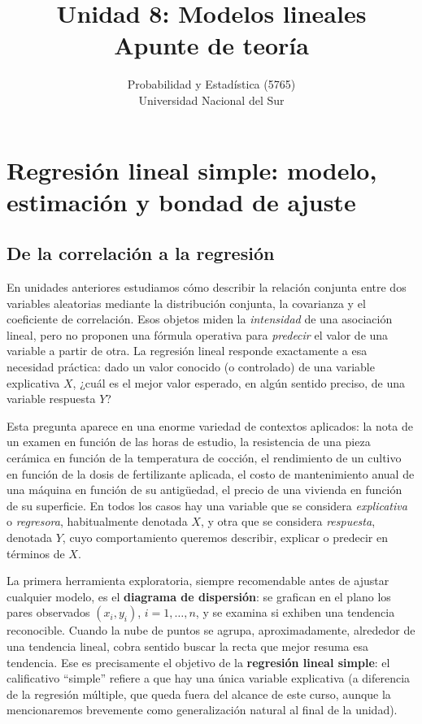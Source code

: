 \documentclass[11pt,a4paper]{article}
\title{Unidad 8: Modelos lineales \\ \large Apunte de teoría}
\author{Probabilidad y Estadística (5765) \\ Universidad Nacional del Sur}
\date{}
\theoremstyle{plain}
\theoremstyle{definition}
\theoremstyle{remark}
\begin{document}
\maketitle
\tableofcontents
\newpage

\section{Regresión lineal simple: modelo, estimación y bondad de ajuste}

\subsection{De la correlación a la regresión}

En unidades anteriores estudiamos cómo describir la relación conjunta entre dos variables aleatorias mediante la distribución conjunta, la covarianza y el coeficiente de correlación. Esos objetos miden la \emph{intensidad} de una asociación lineal, pero no proponen una fórmula operativa para \emph{predecir} el valor de una variable a partir de otra. La regresión lineal responde exactamente a esa necesidad práctica: dado un valor conocido (o controlado) de una variable explicativa $X$, ¿cuál es el mejor valor esperado, en algún sentido preciso, de una variable respuesta $Y$?

Esta pregunta aparece en una enorme variedad de contextos aplicados: la nota de un examen en función de las horas de estudio, la resistencia de una pieza cerámica en función de la temperatura de cocción, el rendimiento de un cultivo en función de la dosis de fertilizante aplicada, el costo de mantenimiento anual de una máquina en función de su antigüedad, el precio de una vivienda en función de su superficie. En todos los casos hay una variable que se considera \emph{explicativa} o \emph{regresora}, habitualmente denotada $X$, y otra que se considera \emph{respuesta}, denotada $Y$, cuyo comportamiento queremos describir, explicar o predecir en términos de $X$.

La primera herramienta exploratoria, siempre recomendable antes de ajustar cualquier modelo, es el \textbf{diagrama de dispersión}: se grafican en el plano los pares observados $(x_i,y_i)$, $i=1,\dots,n$, y se examina si exhiben una tendencia reconocible. Cuando la nube de puntos se agrupa, aproximadamente, alrededor de una tendencia lineal, cobra sentido buscar la recta que mejor resuma esa tendencia. Ese es precisamente el objetivo de la \textbf{regresión lineal simple}: el calificativo ``simple'' refiere a que hay una única variable explicativa (a diferencia de la regresión múltiple, que queda fuera del alcance de este curso, aunque la mencionaremos brevemente como generalización natural al final de la unidad).
\end{document}
